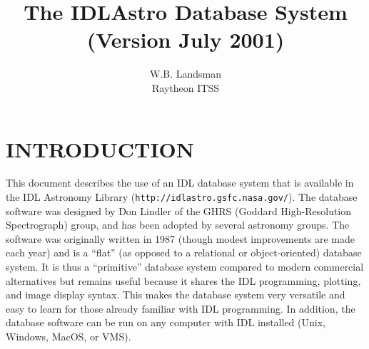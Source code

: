 \topmargin -0.2in
\oddsidemargin-0.15in
\evensidemargin-0.25in
\textheight 8.5in     
\textwidth 6.5in
\newcommand{\de}{$^{\rm o}$ } 
\newcommand{\kms}{km~s$^{-1}$ } 
\newcommand{\exbegin}{\par\medskip}
\newcommand{\exend}{\medskip\noindent}
\newcommand{\exs}[2]{
\hbox to \hsize{\small\hskip .2in
\parbox[t]{2.2in}{\raggedright\setlength{\parindent}{-.2in}\tt #1}
\hspace{.2in}
\parbox[t]{3.4in}{\raggedright\setlength{\parindent}{-.2in}\rm #2}\hss}
\prevdepth=1.5pt\relax}
\newcommand{\exc}[2]{
\hbox to \hsize{\small\hskip .2in
\parbox[t]{3.0in}{\raggedright\setlength{\parindent}{-.2in}\tt #1}
\hspace{.2in}
\parbox[t]{2.6in}{\raggedright\setlength{\parindent}{-.2in}\rm #2}\hss}
\prevdepth=1.5pt\relax}
\newcommand{\exone}[1]{\begin{center}\tt #1 \end{center}}
\newcommand{\ea}{{\em et~al.} {}}
\newcommand{\apjl}{{\em Ap.~J. (Letters)}}

\title{The IDLAstro Database System \\(Version July  2001)}
\author{W.B. Landsman \\ Raytheon ITSS}
\maketitle
\section{INTRODUCTION}

This document describes the use of an IDL database system that is available in
the IDL Astronomy Library ({\tt http://idlastro.gsfc.nasa.gov/}).   The
database software was designed by Don Lindler of the GHRS (Goddard
High-Resolution Spectrograph) group, and  has been adopted by several
astronomy  groups.      The software was originally written in 1987 (though
modest improvements are  made each year) and is a ``flat'' (as opposed to a
relational or object-oriented) database system.   It is thus a ``primitive''
database system compared to modern commercial alternatives but remains useful
because  it shares the IDL programming, plotting, and image display syntax.   
This makes the database system very versatile and easy to learn for those
already familiar with IDL programming.
In addition, the database software can be run on any computer 
with IDL installed (Unix, Windows, MacOS, or VMS).

